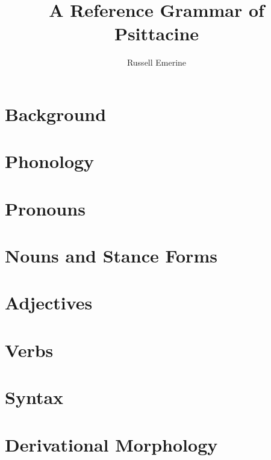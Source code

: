 \documentclass[12pt]{article}
\begin{document}
    \title{A Reference Grammar of Psittacine}
    \date{}
    \author{Russell Emerine}

    \maketitle

    \newpage

    \tableofcontents

    \newpage


    \section{Background}\label{sec:background}
    
    \newpage


    \section{Phonology}\label{sec:phonology}
    
    \newpage


    \section{Pronouns}\label{sec:pronouns}
    
    \newpage


    \section{Nouns and Stance Forms}\label{sec:nouns-and-stance-forms}
    
    \newpage


    \section{Adjectives}\label{sec:adjectives}
    
    \newpage


    \section{Verbs}\label{sec:verbs}
    
    \newpage


    \section{Syntax}\label{sec:syntax}
    
    \newpage


    \section{Derivational Morphology}\label{sec:derivational-morphology}
    
    \newpage
\end{document}
